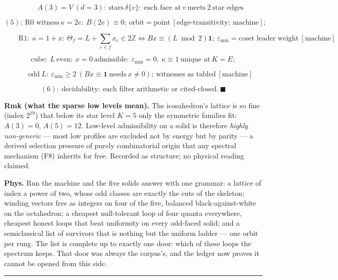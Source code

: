 \begin{theorem}
\[
\qquad A(3)=V\ (d{=}3):\ \text{stars}\ \delta\{v\}:\ \text{each face at}\ v\ \text{meets}\ 2\ \text{star edges}
\]

\[
(5):\ \text{R0 witness}\ \kappa=2e:\ B(2e)\equiv0;\ \text{orbit}=\text{point}\ [\text{edge-transitivity};\ \text{machine}];
\]

\[
\qquad \text{R1}:\ \kappa=1+x:\ \Theta_f=L+\sum_{e\in f}x_e\in2\mathbb Z\iff Bx\equiv(L\bmod2)\mathbf1;\ \varepsilon_{\min}=\text{coset leader weight}\ [\text{machine}]
\]

\[
\text{cube}:\ L\ \text{even}:\ x=0\ \text{admissible}:\ \varepsilon_{\min}=0,\ \kappa\equiv1\ \text{unique at}\ K=E;
\]

\[
\qquad \text{odd}\ L:\ \varepsilon_{\min}\ge2\ (B x\equiv\mathbf1\ \text{needs}\ x\ne0);\ \text{witnesses as tabled}\ [\text{machine}]
\]

\[
(6):\ \text{decidability}:\ \text{each filter arithmetic or cited-closed}.\ \blacksquare
\]

\textbf{Rmk (what the sparse low levels mean).} The icosahedron's lattice is so fine (index $2^{19}$) that below its star level $K{=}5$ only the symmetric families fit: $A(3)=0$, $A(5)=12$. Low-level admissibility on a solid is therefore \textit{highly non-generic} — most low profiles are excluded not by energy but by parity — a derived selection pressure of purely combinatorial origin that any spectral mechanism (F8) inherits for free. Recorded as structure; no physical reading claimed.

\textbf{Phys.} Run the machine and the five solids answer with one grammar: a lattice of index a power of two, whose odd classes are exactly the cuts of the skeleton; winding vectors free as integers on four of the five, balanced black-against-white on the octahedron; a cheapest null-tolerant loop of four quanta everywhere, cheapest honest loops that beat uniformity on every odd-faced solid; and a semiclassical list of survivors that is nothing but the uniform ladder — one orbit per rung. The list is complete up to exactly one door: which of these loops the spectrum keeps. That door was always the corpus's, and the ledger now proves it cannot be opened from this side.

\vspace{2pt}\noindent\rule{\textwidth}{0.4pt}\vspace{2pt}

\end{theorem}

